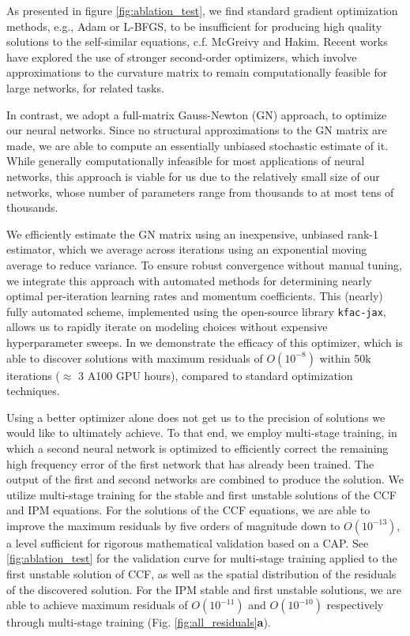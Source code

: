 \documentclass[fleqn,11pt]{wlscirep}
\begin{document}
As presented in figure \ref{fig:ablation_test}, we find standard gradient optimization methods, e.g., Adam or L-BFGS, to be insufficient for producing high quality solutions to the self-similar equations, c.f. McGreivy and Hakim\cite{mcgreivy2024weak}. Recent works have explored the use of stronger second-order optimizers, which involve approximations to the curvature matrix to remain computationally feasible for large networks, for related tasks\cite{muller2023achieving,Jnini-Vella-Zeinhofer:gauss-newton-natural-gradient-pinn,dangel2024kronecker}.

In contrast, we adopt a {full-matrix} Gauss-Newton (GN) approach\cite{nocedal1999numerical}, to optimize our neural networks\cite{martens2020new}. Since no structural approximations to the GN matrix are made, we are able to compute an essentially unbiased stochastic estimate of it. While generally computationally infeasible for most applications of neural networks, this approach is viable for us due to the relatively small size of our networks, whose number of parameters range from thousands to at most tens of thousands. 

We efficiently estimate the GN matrix using an inexpensive, unbiased rank-1 estimator, which we average across iterations using an exponential moving average to reduce variance. To ensure robust convergence without manual tuning, we integrate this approach with automated methods\cite{martens2015optimizing} for determining nearly optimal per-iteration learning rates and momentum coefficients. This (nearly) fully automated scheme, implemented using the open-source library \texttt{kfac-jax}\cite{kfac-jax2022github}, allows us to rapidly iterate on modeling choices without expensive hyperparameter sweeps. In  we demonstrate the efficacy of this optimizer, which is able to discover solutions with maximum residuals of $O(10^{-8})$ within 50k iterations ($\approx$ 3 A100 GPU hours), compared to standard optimization techniques.


Using a better optimizer alone does not get us to the precision of solutions we would like to ultimately achieve. To that end, we employ multi-stage training\cite{Wang-Lai:multistage-nn}, in which a second neural network is optimized to efficiently correct the remaining high frequency error of the first network that has already been trained. The output of the first and second networks are combined to produce the solution. We utilize multi-stage training for the stable and first unstable solutions of the CCF and IPM equations. For the solutions of the CCF equations, we are able to improve the maximum residuals by five orders of magnitude down to $O(10^{-13})$, a level sufficient for rigorous mathematical validation based on a CAP. See \cref{fig:ablation_test} for the validation curve for multi-stage training applied to the first unstable solution of CCF, as well as the spatial distribution of the residuals of the discovered solution. For the IPM stable and first unstable solutions, we are able to achieve maximum residuals of $O(10^{-11})$ and $O(10^{-10})$ respectively through multi-stage training (Fig. \ref{fig:all_residuals}\textbf{a}).
\end{document}
